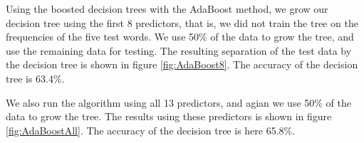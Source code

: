 \FloatBarrier
\noindent Using the boosted decision trees with the AdaBoost method, we grow our decision tree using the first 8 predictors, that is, we did not train the tree on the frequencies of the five test words. We use 50\% of the data to grow the tree, and use the remaining data for testing. The resulting separation of the test data by the decision tree is shown in figure \ref{fig:AdaBoost8}. The accuracy of the decision tree is 63.4\%.

\noindent We also run the algorithm using all 13 predictors, and agian we use 50\% of the data to grow the tree. The results using these predictors is shown in figure \ref{fig:AdaBoostAll}. The accuracy of the decision tree is here 65.8\%.\\

